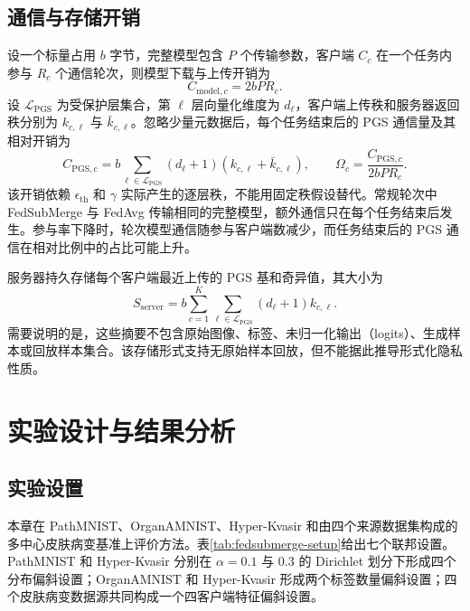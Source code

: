 \subsection{通信与存储开销}
\label{subsec:fedsubmerge-theory-communication}

设一个标量占用 $b$ 字节，完整模型包含 $P$ 个传输参数，客户端 $C_c$ 在一个任务内参与 $R_c$ 个通信轮次，则模型下载与上传开销为
\begin{equation}
C_{\mathrm{model},c}=2bPR_c.
\label{eq:fedsubmerge-model-communication}
\end{equation}
设 $\mathcal{L}_{\mathrm{PGS}}$ 为受保护层集合，第 $\ell$ 层向量化维度为 $d_{\ell}$，客户端上传秩和服务器返回秩分别为 $k_{c,\ell}$ 与 $\bar k_{c,\ell}$。忽略少量元数据后，每个任务结束后的 PGS 通信量及其相对开销为
\begin{equation}
C_{\mathrm{PGS},c}
=
b\sum_{\ell\in\mathcal{L}_{\mathrm{PGS}}}
(d_{\ell}+1)(k_{c,\ell}+\bar k_{c,\ell}),
\qquad
\Omega_c
=
\frac{C_{\mathrm{PGS},c}}{2bPR_c}.
\label{eq:fedsubmerge-pgs-communication}
\end{equation}
该开销依赖 $\epsilon_{\mathrm{th}}$ 和 $\gamma$ 实际产生的逐层秩，不能用固定秩假设替代。常规轮次中 FedSubMerge 与 FedAvg 传输相同的完整模型，额外通信只在每个任务结束后发生。参与率下降时，轮次模型通信随参与客户端数减少，而任务结束后的 PGS 通信在相对比例中的占比可能上升。

服务器持久存储每个客户端最近上传的 PGS 基和奇异值，其大小为
\begin{equation}
S_{\mathrm{server}}
=
b\sum_{c=1}^{K}
\sum_{\ell\in\mathcal{L}_{\mathrm{PGS}}}
(d_{\ell}+1)k_{c,\ell}.
\label{eq:fedsubmerge-server-storage}
\end{equation}
需要说明的是，这些摘要不包含原始图像、标签、未归一化输出（logits）、生成样本或回放样本集合。该存储形式支持无原始样本回放，但不能据此推导形式化隐私性质。

\section{实验设计与结果分析}
\label{sec:fedsubmerge-experiments}

\subsection{实验设置}
\label{subsec:fedsubmerge-experimental-setup}

本章在 PathMNIST、OrganAMNIST、Hyper-Kvasir 和由四个来源数据集构成的多中心皮肤病变基准上评价方法\cite{yang2023medmnist,borgli2020hyperkvasir,tschandl2018ham10000,kawahara2019derm7pt,combalia2019bcn20000,ballerini2013dermofit}。表\ref{tab:fedsubmerge-setup}给出七个联邦设置。PathMNIST 和 Hyper-Kvasir 分别在 $\alpha=0.1$ 与 $0.3$ 的 Dirichlet 划分下形成四个分布偏斜设置；OrganAMNIST 和 Hyper-Kvasir 形成两个标签数量偏斜设置；四个皮肤病变数据源共同构成一个四客户端特征偏斜设置。

